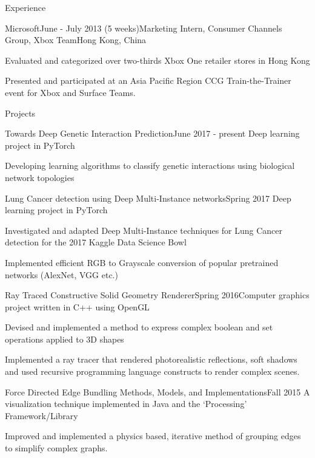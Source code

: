 \documentclass{resume}
\begin{document}
\begin{rSection}{Experience}
    \begin{rSubsection}{Microsoft}{June - July 2013 (5 weeks)}{Marketing Intern, Consumer Channels Group, Xbox Team}{Hong Kong, China}
    \item Evaluated and categorized over two-thirds Xbox One retailer stores in Hong Kong
    \item Presented and participated at an Asia Pacific Region CCG Train-the-Trainer event for Xbox and Surface Teams.
    \end{rSubsection}

  \end{rSection}

  \begin{rSection}{Projects}
    \begin{rSubsection}{Towards Deep Genetic Interaction Prediction}{June 2017 - present}
    {Deep learning project in PyTorch}{ }
    \item Developing learning algorithms to classify genetic interactions using biological network topologies
    \end{rSubsection}
    \begin{rSubsection}{Lung Cancer detection using Deep Multi-Instance networks}{Spring 2017}
    {Deep learning project in PyTorch}{ }
    \item Investigated and adapted Deep Multi-Instance techniques for Lung Cancer detection for the 2017 Kaggle Data Science Bowl
    \item Implemented efficient RGB to Grayscale conversion of popular pretrained networks (AlexNet, VGG etc.)
    \end{rSubsection}
    \begin{rSubsection}{Ray Traced Constructive Solid Geometry Renderer}{Spring 2016}{Computer graphics project written in C++ using OpenGL}{ }
    \item Devised and implemented a method to express complex boolean and set operations applied to 3D shapes
    \item Implemented a ray tracer that rendered photorealistic reflections, soft shadows and used recursive programming language constructs to render complex scenes.
    \end{rSubsection}
    \begin{rSubsection}{Force Directed Edge Bundling Methods, Models, and Implementations}{Fall 2015}
    {A visualization technique implemented in Java and the `Processing' Framework/Library} {}
    \item Improved and implemented a physics based, iterative method of grouping edges to simplify complex graphs.

\end{rSubsection}
\end{rSection}
\end{document}
